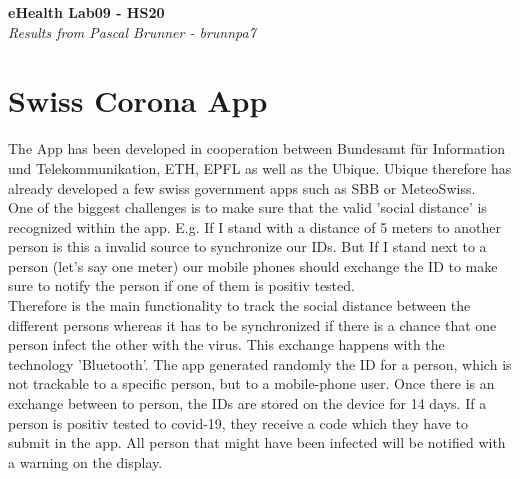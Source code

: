 \documentclass{report}
\newenvironment{Figure}
	{\par\medskip\noindent\minipage{\linewidth}}
	{\endminipage\par\medskip}
\begin{document}
\begin{titlepage}
   \begin{center}
      \Large\textbf{eHealth Lab09 - HS20}\\
      \large\textit{Results from Pascal Brunner - brunnpa7}
   \end{center}
\end{titlepage}


\section*{Swiss Corona App}

The App has been developed in cooperation between Bundesamt für Information und Telekommunikation, ETH, EPFL as well as the Ubique. Ubique therefore has already developed a few swiss government apps such as SBB or MeteoSwiss.\\
One of the biggest challenges is to make sure that the valid 'social distance' is recognized within the app. E.g. If I stand with a distance of 5 meters to another person is this a invalid source to synchronize our IDs. But If I stand next to a person (let's say one meter)
our mobile phones should exchange the ID to make sure to notify the person if one of them is positiv tested.\\

Therefore is the main functionality to track the social distance between the different persons whereas it has to be synchronized if there is a chance that one person infect the other with the virus. This exchange happens with the technology 'Bluetooth'.
The app generated randomly the ID for a person, which is not trackable to a specific person, but to a mobile-phone user. Once there is an exchange between to person, the IDs are stored on the device for 14 days.
If a person is positiv tested to covid-19, they receive a code which they have to submit in the app. All person that might have been infected will be notified with a warning on the display.\\
\end{document}

